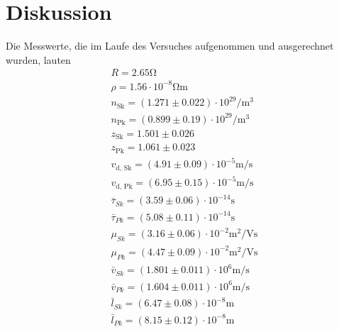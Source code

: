 \section{Diskussion}
\label{sec:Diskussion}
Die Messwerte, die im Laufe des Versuches aufgenommen und ausgerechnet wurden,
lauten
\begin{align*}
R = 2.65 \si{\ohm} \\
\rho = 1.56 \cdot 10^{-8} \si{\ohm\m} \\
n_\text{Sk} = \left( 1.271 \pm 0.022 \right) \cdot 10^{29} \si{\per\m\cubed}\\
n_\text{Pk} = \left( 0.899 \pm 0.19 \right) \cdot 10^{29} \si{\per\m\cubed}\\
z_\text{Sk} = 1.501 \pm 0.026 \\
z_\text{Pk} = 1.061 \pm 0.023 \\
v_\text{d, Sk} = (4.91 \pm 0.09) \cdot 10^{-5} \si{\m\per\s}\\
v_\text{d, Pk} = (6.95 \pm 0.15)  \cdot 10^{-5} \si{\m\per\s}\\
\bar{\tau}_{Sk} = \left( 3.59 \pm 0.06 \right) \cdot 10^{-14} \si{\s}\\
\bar{\tau}_{Pk} = \left( 5.08 \pm 0.11 \right) \cdot 10^{-14} \si{\s}\\
\mu_{Sk} = \left( 3.16 \pm 0.06 \right) \cdot 10^{-2} \si{\m\squared\per\volt\s} \\
\mu_{Pk} = \left( 4.47 \pm 0.09 \right) \cdot 10^{-2}\si{\m\squared\per\volt\s} \\
\bar{v}_{Sk} = \left( 1.801 \pm 0.011 \right) \cdot 10^{6} \si{\m\per\s}\\
\bar{v}_{Pk} = \left( 1.604 \pm 0.011 \right) \cdot 10^{6} \si{\m\per\s}\\
\bar{l}_{Sk} = \left( 6.47 \pm 0.08 \right) \cdot 10^{-8} \si{\m}\\
\bar{l}_{Pk} = \left( 8.15 \pm 0.12 \right) \cdot 10^{-8} \si{\m}
\end{align*}

